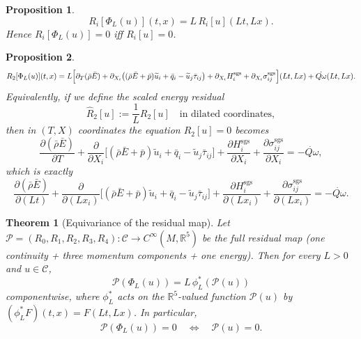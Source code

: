 \documentclass[10pt,a4paper]{amsart}
\newtheorem{proposition}{Proposition}
\newtheorem{theorem}{Theorem}
\newcommand{\Qdot}{\dot{Q\omega}}
\newcommand{\R}{\mathbb{R}}
\newcommand{\barE}{\bar{E}}
\newcommand{\barp}{\bar{p}}
\newcommand{\barq}{\bar{q}}
\newcommand{\barrho}{\bar{\rho}}
\newcommand{\bartau}{\bar{\tau}}
\newcommand{\sgs}{\mathrm{sgs}}
\newcommand{\tilu}{\widetilde{u}}
\begin{document}
\begin{proposition}
\label{prop:momentum}
\[
R_i[\Phi_L(u)](t,x)=L\,R_i[u](Lt,Lx).
\]
Hence $R_i[\Phi_L(u)]=0$ iff $R_i[u]=0$.
\end{proposition}

\begin{proposition}
\label{prop:energy}
\[
R_2[\Phi_L(u)](t,x)
=L\Bigl[\partial_T(\barrho\barE)
+\partial_{X_i}\bigl((\barrho\barE+\barp)\tilu_i+\barq_i
-\tilu_j\bartau_{ij}\bigr)
+\partial_{X_i}H^{\sgs}_i
+\partial_{X_i}\sigma^{\sgs}_{ij}\Bigr](Lt,Lx)
+\Qdot(Lt,Lx).
\]
Equivalently, if we define the \emph{scaled energy residual}
\[
\widehat R_2[u]:=\frac{1}{L}R_2[u]\quad\text{in dilated coordinates},
\]
then in $(T,X)$ coordinates the equation $R_2[u]=0$ becomes
\[
\frac{\partial(\barrho\barE)}{\partial T}
+\frac{\partial}{\partial X_i}\bigl[(\barrho\barE+\barp)\tilu_i
+\barq_i-\tilu_j\bartau_{ij}\bigr]
+\frac{\partial H^{\sgs}_i}{\partial X_i}
+\frac{\partial\sigma^{\sgs}_{ij}}{\partial X_i}
=-\Qdot,
\]
which is exactly
\[
\frac{\partial(\barrho\barE)}{\partial(Lt)}
+\frac{\partial}{\partial(Lx_i)}\bigl[(\barrho\barE+\barp)\tilu_i
+\barq_i-\tilu_j\bartau_{ij}\bigr]
+\frac{\partial H^{\sgs}_i}{\partial(Lx_i)}
+\frac{\partial\sigma^{\sgs}_{ij}}{\partial(Lx_i)}
=-\Qdot.
\]
\end{proposition}

\begin{theorem}[Equivariance of the residual map]
\label{thm:equivariance}
Let $\mathcal P=(R_0,R_1,R_2,R_3,R_4):\mathcal C\to C^\infty(M,\R^5)$ be the
full residual map (one continuity + three momentum components + one energy).
Then for every $L>0$ and $u\in\mathcal C$,
\[
\mathcal P(\Phi_L(u))=L\,\phi_L^*(\mathcal P(u))
\]
componentwise, where $\phi_L^*$ acts on the $\R^5$-valued function
$\mathcal P(u)$ by $(\phi_L^*F)(t,x)=F(Lt,Lx)$.  In particular,
\[
\mathcal P(\Phi_L(u))=0\quad\Longleftrightarrow\quad\mathcal P(u)=0.
\]
\end{theorem}
\end{document}
